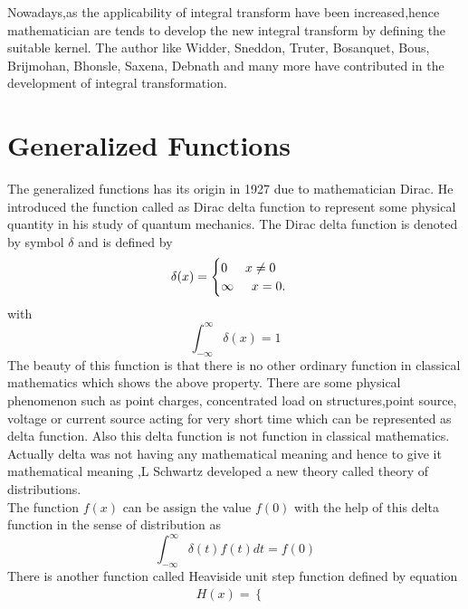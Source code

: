 \begin{large}
Nowadays,as the applicability of integral transform have been increased,hence mathematician are tends to develop the new integral transform by defining the suitable kernel. The author like Widder, Sneddon, Truter, Bosanquet, Bous, Brijmohan, Bhonsle, Saxena, Debnath and many more have contributed in the development of integral transformation.\\

\section{Generalized Functions}
The generalized functions has its origin in 1927 due to mathematician Dirac. He introduced the function called as Dirac delta function to represent some physical quantity in his study of quantum mechanics. The Dirac\cite{R36} delta function is denoted by symbol $ \delta $ and is defined by
\begin{align*}
  \delta(x) = \begin{cases}
  0\hspace{0.5cm}  x\neq 0 \\
  \infty\hspace{0.5cm} x=0.
  \end{cases}
 \end{align*}
with 
\begin{equation}
\int_{-\infty}^{\infty}\delta(x)=1
\end{equation}
The beauty of this function is that there is no other ordinary function in classical mathematics which shows the above property. There are some physical phenomenon such as point charges, concentrated load on structures,point source, voltage or current source acting for very short time which can be represented as delta function. Also this delta function is not function in classical mathematics. Actually delta was not having any mathematical meaning and hence to give it mathematical meaning ,L Schwartz developed a new theory called theory of distributions.\\
The function $ f(x) $ can be assign the value $ f(0) $ with the help of this delta function in the sense of distribution as\\
\begin{equation}
\int _{-\infty}^{\infty} \delta(t)f(t)dt=f(0)
\end{equation}
There is another function called Heaviside unit step function defined by equation
\begin{align*}
  H(x) = \begin{cases}

\end{cases}
\end{align*}
\end{large}
